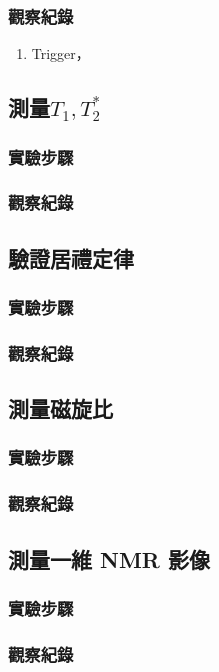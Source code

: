 \documentclass[twocolumn]{article}
\begin{document}
\subsubsection*{觀察紀錄}
\begin{enumerate}
    \item Trigger，
\end{enumerate}

\subsection{測量$T_1, T_2^*$}
\subsubsection*{實驗步驟}
\subsubsection*{觀察紀錄}

\subsection{驗證居禮定律}
\subsubsection*{實驗步驟}
\subsubsection*{觀察紀錄}

\subsection{測量磁旋比}
\subsubsection*{實驗步驟}
\subsubsection*{觀察紀錄}

\subsection{測量一維 NMR 影像}
\subsubsection*{實驗步驟}
\subsubsection*{觀察紀錄}
\end{document}
